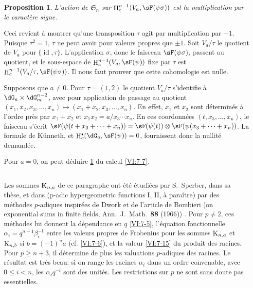 \documentclass[oneside]{book}
\DeclareMathOperator{\h}{H}
\newcommand{\kloos}{\textnormal{K}} %
\theoremstyle{sga-source}
\theoremstyle{sga-source-dash}
\theoremstyle{sga-source-dotdash}
\theoremstyle{sga-source-number-note-dash}
\theoremstyle{sga-source-note-number-dotdash}
\theoremstyle{sga-source-example-dotdash}
\theoremstyle{sga-source-inline-number}
\theoremstyle{sga-source-bare-number}
\theoremstyle{sga-source}
\newtheorem{proposition_}[subsection]{Proposition}
\let\oldbullet\bullet
\renewcommand{\bullet}{\textnormal{\tiny$\oldbullet$}}
\newcommand{\PrintPage}[1]{}\newcommand{\MathPage}[1]{}\newcommand{\PrintCite}[2]{#1}\newcommand{\var}[3]{#2}
\begin{document}
\begin{proposition_}\label{VI:7-20}
L'action de $\mathfrak{S}_n$ sur $\h_c^{n-1}(V_a,\sF(\psi\sigma))$ est la multiplication 
par le caractère signe. 
\end{proposition_}

Ceci revient à montrer qu'une transposition $\tau$ agit par multiplication 
par $-1$. Puisque $\tau^2=1$, $\tau$ ne peut avoir \var{pour valeur propres}{pour valeurs propres}{S45-SOL-0971} que 
$\pm 1$. Soit $V_a/\tau$ le quotient de $V_a$ pour 
$\{\operatorname{id},\tau\}$. L'application $\sigma$, donc le faisceau 
$\sF(\psi\sigma)$, passent au quotient, et le sous-espace de 
$\h_c^{n-1}(V_a,\sF(\psi))$ fixe par 
$\tau$ est $\h_c^{n-1}(V_a/\tau,\sF(\psi\sigma))$. Il nous faut prouver que 
cette cohomologie est nulle. 

Supposons que $a\ne 0$. Pour $\tau=(1,2)$ le quotient $V_a/\tau$ s'identifie 
à $\dG_a\times \dG_m^{n-2}$, avec pour application de passage au quotient 
$(x_1,x_2,x_3,\dots,x_n)\mapsto (x_1+x_2,x_3,\dots,x_n)$. En effet, $x_1$ et 
$x_2$ sont déterminés \PrintPage{229}
à l'ordre près par $x_1+x_2$ et 
$x_1x_2 = a/x_3\dotsm x_n$. En ces coordonnées $(t,x_3,\dots,x_n)$, le 
faisceau s'écrit 
$\sF(\psi(t+x_3+\cdots + x_n)) = \sF(\psi(t))\otimes \sF(\psi(x_3+\cdots + x_n))$. 
La formule de K\"unneth, et $\var{\h_0^\bullet(\dG_a,\sF(\psi))}{\h_c^\bullet(\dG_a,\sF(\psi))}{S45-SOL-0973} = 0$, fournissent 
donc la nullité demandée. 

Pour $a=0$, on peut déduire \ref{VI:7-20} du calcul \ref{VI:7-7}. 





\subsection{}\label{VI:7-21}

Les sommes $\kloos_{n,a}$ de ce paragraphe ont été étudiées par 
S.\ Sperber, dans sa thèse, et dans (p-adic hypergeometric functions I, II, à paraître) \cite{sp77} par des méthodes 
$p$-adiques inspirées de Dwork et de l'article de Bombieri (on exponential sums in finite fields, Ann.~J.~Math.~\textbf{88} (1966)) \cite{bo66}. 
Pour $p\ne 2$, ces méthodes lui donnent la dépendance en $q$ \ref{VI:7-5}, 
l'équation fonctionnelle $\alpha_i = q^{n-1} \beta_i^{-1}$ entre les 
valeurs propres de Frobenius pour les sommes $\kloos_{n,a}$ et 
$\kloos_{n,b}$ si $b=(-1)^n a$ (cf. \ref{VI:7-6}), et la valeur \ref{VI:7-15} 
du produit des racines. Pour $p\geqslant n+3$, il détermine de plus les 
valuations $p$-adiques des racines. Le résultat est très beau: si on range 
les racines $\alpha_i$ dans un ordre convenable, avec 
$0\leqslant i<n$, les $\alpha_i q^{-i}$ sont des unités. Les 
restrictions sur $p$ ne sont sans doute pas essentielles. 
\end{document}
